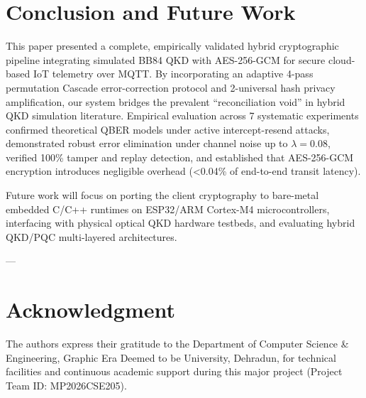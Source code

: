 \documentclass[journal,10pt,twocolumn]{article}
\begin{document}
\section{Conclusion and Future Work}
This paper presented a complete, empirically validated hybrid cryptographic pipeline integrating simulated BB84 QKD with AES-256-GCM for secure cloud-based IoT telemetry over MQTT. By incorporating an adaptive 4-pass permutation Cascade error-correction protocol and 2-universal hash privacy amplification, our system bridges the prevalent ``reconciliation void'' in hybrid QKD simulation literature. Empirical evaluation across 7 systematic experiments confirmed theoretical QBER models under active intercept-resend attacks, demonstrated robust error elimination under channel noise up to $\lambda = 0.08$, verified 100\% tamper and replay detection, and established that AES-256-GCM encryption introduces negligible overhead (<0.04\% of end-to-end transit latency).

Future work will focus on porting the client cryptography to bare-metal embedded C/C++ runtimes on ESP32/ARM Cortex-M4 microcontrollers, interfacing with physical optical QKD hardware testbeds, and evaluating hybrid QKD/PQC multi-layered architectures.

---

\section*{Acknowledgment}
The authors express their gratitude to the Department of Computer Science \& Engineering, Graphic Era Deemed to be University, Dehradun, for technical facilities and continuous academic support during this major project (Project Team ID: MP2026CSE205).



\end{document}

